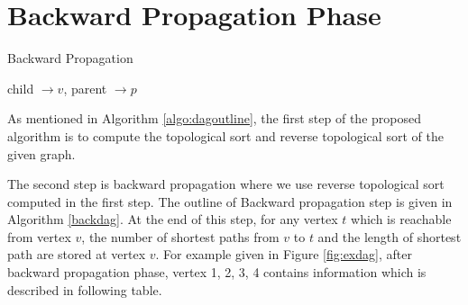 \section{Backward Propagation Phase}
\begin{algorithm}
\caption{Backward Propagation}
\label{backdag}
child $\rightarrow v$, parent $\rightarrow p$ \\

\end{algorithm}
As mentioned in Algorithm \ref{algo:dagoutline}, the first step of the proposed algorithm is to compute the topological sort and reverse topological sort of the given graph.

The second step is backward propagation where we use reverse topological sort computed in the first step. The outline of Backward propagation step is given in Algorithm \ref{backdag}. At the end of this step, for any vertex $t$ which is reachable from vertex $v$, the number of shortest paths from $v$ to $t$ and the length of shortest path are stored at vertex $v$. 
For example given in Figure \ref{fig:exdag}, after backward propagation phase, vertex 1, 2, 3, 4 contains information which is described in following table.





